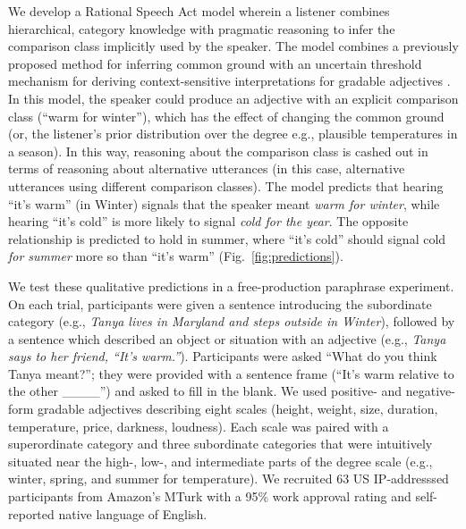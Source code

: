 \documentclass[letterpaper, 12pt]{article}
\begin{document}
We develop a Rational Speech Act model wherein a listener combines hierarchical, category knowledge with pragmatic reasoning to infer the comparison class implicitly used by the speaker.
The model combines a previously proposed method for inferring common ground \cite{Degen2015} with an uncertain threshold mechanism for deriving context-sensitive interpretations for gradable adjectives \cite{Lassiter2015}.
In this model, the speaker could produce an adjective with an explicit comparison class (``warm for winter''), which has the effect of changing the common ground (or, the listener's prior distribution over the degree e.g., plausible temperatures in a season).
In this way, reasoning about the comparison class is cashed out in terms of reasoning about alternative utterances (in this case, alternative utterances using different comparison classes).
The model predicts that hearing \enquote{it's warm} (in Winter) signals that the speaker meant \emph{warm for winter}, while hearing \enquote{it's cold} is more likely to signal \emph{cold for the year}. 
The opposite relationship is predicted to hold in summer, where \enquote{it's cold} should signal cold \emph{for summer} more so than \enquote{it's warm} (Fig.~\ref{fig:predictions}). 

We test these qualitative predictions in a free-production paraphrase experiment.
On each trial, participants were given a sentence introducing the subordinate category (e.g., \emph{Tanya lives in Maryland and steps outside in Winter}), followed by a sentence which described an object or situation with an adjective (e.g., \emph{Tanya says to her friend, ``It’s warm.''}). 
Participants were asked ``What do you think Tanya meant?''; they were provided with a sentence frame (``It's warm relative to the other \_\_\_\_'') and asked to fill in the blank.
We used positive- and negative-form gradable adjectives describing eight scales (height, weight, size, duration, temperature, price, darkness, loudness). 
Each scale was paired with a superordinate category and three subordinate categories that were intuitively situated near the high-, low-, and intermediate parts of the degree scale (e.g., winter, spring, and summer for temperature). 
We recruited 63 US IP-addresssed participants from Amazon's MTurk with a 95\% work approval rating and self-reported native language of English.
\end{document}
